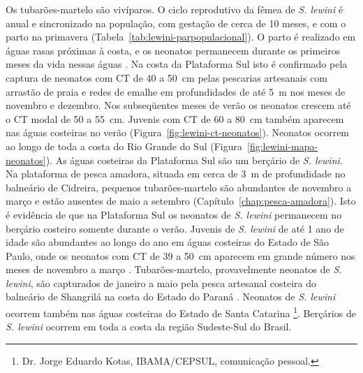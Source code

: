 \documentclass[a4paper,11pt,twoside,showtrims,onecolumn,openright,final]{memoir}
\begin{document}
Os tubarões-martelo são vivíparos. O ciclo reprodutivo da fêmea de \emph{S. lewini} é anual 
e sincronizado na população, com gestação de cerca de 10 meses, e com o parto na primavera (Tabela~\ref{tab:lewini-parpopulacional}). 
O parto é realizado em águas rasas próximas à costa, e os neonatos permanecem durante os primeiros meses 
da vida nessas águas \citep{COMPAGNO1984B,chen1988,branstetter1990}. %
Na costa da Plataforma Sul isto é confirmado pela captura de neonatos com CT de 40 a 50~cm pelas pescarias 
artesanais com arrastão de praia e redes de emalhe em profundidades de até 5~m  nos meses 
de novembro e dezembro.  %
Nos subseqüentes meses de verão os neonatos crescem até o CT modal de 50 a 55~cm. 
Juvenis com CT de 60 a 80~cm  também aparecem nas águas costeiras 
no verão (Figura~\ref{fig:lewini-ct-neonatos}). 
Neonatos ocorrem ao longo de toda a costa do Rio Grande do Sul (Figura~\ref{fig:lewini-mapa-neonatos}).  
As águas costeiras da Plataforma Sul são um berçário de \emph{S. lewini}.
Na plataforma de pesca amadora, situada em cerca de 3~m de profundidade no balneário de Cidreira, 
pequenos tubarões-martelo são abundantes de novembro a março e estão ausentes de maio 
a setembro (Capítulo~\ref{chap:pesca-amadora}).  %
Isto é evidência de que na Plataforma Sul os neonatos de \emph{S. lewini}  permanecem no berçário 
costeiro somente durante o verão. Juvenis de \emph{S. lewini} de até 1 ano de idade são abundantes 
ao longo do ano em águas costeiras do Estado de São Paulo, onde os neonatos com CT de 39 a 50~cm 
aparecem em grande número nos meses de novembro a março \citep{sadowsky1967}. %
Tubarões-martelo, provavelmente neonatos de \emph{S. lewini}, são capturados de janeiro a maio 
pela pesca artesanal costeira do balneário de Shangrilá na costa do Estado do Paraná \citep{carniel2005}. %
Neonatos de \emph{S. lewini}  ocorrem também nas águas costeiras do Estado de Santa Catarina \footnote{Dr. Jorge Eduardo Kotas, IBAMA/CEPSUL, comunicação pessoal.}. 
Berçários de \emph{S. lewini} ocorrem em toda a costa da região Sudeste-Sul do Brasil.

%
%
\end{document}
